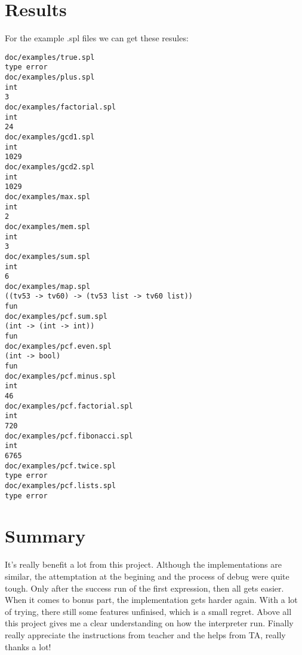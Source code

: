 \documentclass[paper=a4, fontsize=11pt]{scrartcl}
\begin{document}
\section{Results}
For the example .spl files we can get these resules:
\begin{lstlisting}[title=Result, frame=shadowbox]
doc/examples/true.spl
type error
doc/examples/plus.spl
int
3
doc/examples/factorial.spl
int
24
doc/examples/gcd1.spl
int
1029
doc/examples/gcd2.spl
int
1029
doc/examples/max.spl
int
2
doc/examples/mem.spl
int
3
doc/examples/sum.spl
int
6
doc/examples/map.spl
((tv53 -> tv60) -> (tv53 list -> tv60 list))
fun
doc/examples/pcf.sum.spl
(int -> (int -> int))
fun
doc/examples/pcf.even.spl
(int -> bool)
fun
doc/examples/pcf.minus.spl
int
46
doc/examples/pcf.factorial.spl
int
720
doc/examples/pcf.fibonacci.spl
int
6765
doc/examples/pcf.twice.spl
type error
doc/examples/pcf.lists.spl
type error
\end{lstlisting}



\section{Summary}
It's really benefit a lot from this project. Although the implementations are similar, the attemptation at the begining and the process of debug were quite tough. Only after the success run of the first expression, then all gets easier. When it comes to bonus part, the implementation gets harder again. With a lot of trying, there still some features unfinised, which is a small regret. Above all this project gives me a clear understanding on how the interpreter run. Finally really appreciate the instructions from teacher and the helps from TA, really thanks a lot!
\end{document}

